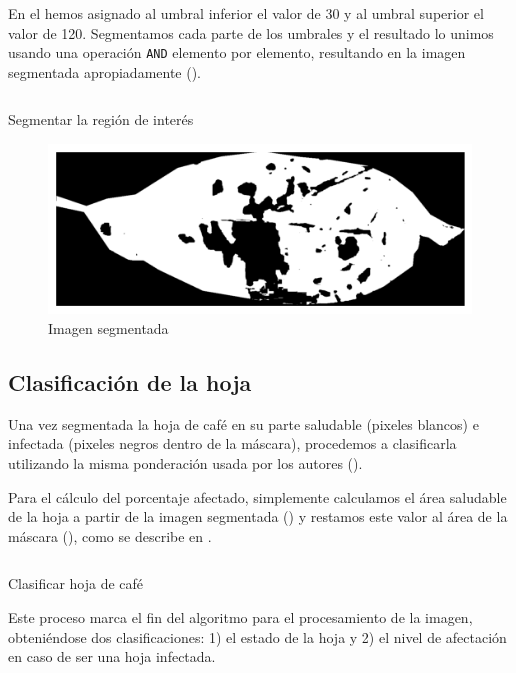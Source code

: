 En el  hemos asignado al umbral inferior el valor de 30 y al umbral superior el valor de 120. Segmentamos cada parte de los umbrales y el resultado lo unimos usando una operación \texttt{AND} elemento por elemento, resultando en la imagen segmentada apropiadamente ().

\begin{listing}[H]
\inputminted{python}{code_listings/segmentation.py}
\caption{Segmentar la región de interés}
\label{code:segmentation}
\end{listing}

\begin{figure}[H]
\centering
\includegraphics[scale=1]{images/segmentation.png}
\caption{Imagen segmentada}
\label{img:segmentation}
\end{figure}

\subsection{Clasificación de la hoja}
Una vez segmentada la hoja de café en su parte saludable (pixeles blancos) e infectada (pixeles negros dentro de la máscara), procedemos a clasificarla utilizando la misma ponderación usada por los autores ().

Para el cálculo del porcentaje afectado, simplemente calculamos el área saludable de la hoja a partir de la imagen segmentada () y restamos este valor al área de la máscara (), como se describe en .

\begin{listing}[H]
\inputminted{python}{code_listings/categorize.py}
\caption{Clasificar hoja de café}
\label{code:categorize}
\end{listing}

Este proceso marca el fin del algoritmo para el procesamiento de la imagen, obteniéndose dos clasificaciones: 1) el estado de la hoja y 2) el nivel de afectación en caso de ser una hoja infectada.

